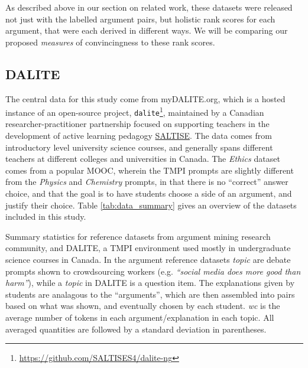 \documentclass[notitlepage,12pt]{jedm}
\begin{document}
As described above in our section on related work, these datasets were released 
not just with the labelled argument pairs, but holistic rank scores for each 
argument, that were each derived in different ways. 
We will be comparing our proposed \textit{measures} of convincingness to these 
rank scores.


\subsection{DALITE}
The central data for this study come from myDALITE.org, which is a hosted 
instance of an open-source project, 
\verb|dalite|\footnote{\url{https://github.com/SALTISES4/dalite-ng}}, 
maintained by a Canadian researcher-practitioner partnership focused on 
supporting teachers in the development of active learning pedagogy 
\href{saltise.ca}{SALTISE}.
The data comes from introductory level university science courses, and 
generally spans different teachers at different colleges and universities in 
Canada. 
The \textit{Ethics} dataset comes from a popular MOOC, wherein the TMPI prompts 
are slightly different from the \textit{Physics} and \textit{Chemistry} 
prompts, in that there is no ``correct'' answer choice, and that the goal is to 
have students choose a side of an argument, and justify their choice.
Table \ref{tab:data_summary} gives an overview of the datasets included in this 
study.


\begin{table}
	
	\caption{
		Summary statistics for reference datasets from argument mining research 
		community, and DALITE, a TMPI environment used mostly in undergraduate 
		science courses in Canada. 
		In the argument reference datasets \textit{topic} are debate prompts 
		shown to crowdsourcing workers (e.g. \textit{``social media does more 
		good than harm''}), while a \textit{topic} in DALITE is a question item.
		The explanations given by students are analagous to the ``arguments'',  
		which are then assembled into pairs based on what was shown, and 
		eventually chosen by each student.
		\textit{wc} is the average number of tokens in each 
		argument/explanation in each topic.
		All averaged quantities are followed by a standard deviation in 
		parentheses.
	}
	\label{tab:data_summary}
\end{table}
\end{document}
